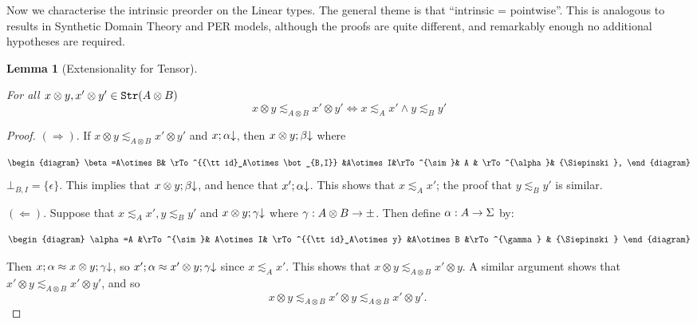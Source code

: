 \documentclass[11pt]{article}
\newtheorem{lemma}[theorem]{Lemma}
\newcommand{\Ip}[1]{\lesssim_{#1}}
\begin{document}
Now we characterise the intrinsic preorder on the Linear types. The
general theme is that ``intrinsic = pointwise''. This is analogous to
results in Synthetic Domain Theory and PER models, although the proofs
are quite different, and remarkably enough no additional hypotheses
are required.
\begin{lemma}[Extensionality for Tensor]\label{EfT}

For all $x\otimes y, x'\otimes y'\in{\tt Str}(A\otimes B)$
$$x\otimes y\Ip{A\otimes B} x'\otimes y' \Longleftrightarrow x\Ip A x'
\wedge y\Ip B y'$$
\end{lemma}
\begin{proof} $(\Rightarrow)$. If $x\otimes y\Ip{A\otimes B}
x'\otimes y'$ and $x;\alpha{\downarrow}$, then $x\otimes
y;\beta{\downarrow}$ where

\[\begin{diagram}
\beta=A\otimes B& \rTo^{{\tt id}_A\otimes\bot_{B,I}} &A\otimes
I&\rTo^{\sim}& A & \rTo^{\alpha}& {\Siepinski},
\end{diagram} \]
\noindent $\bot_{B,I}=\{\epsilon\}$. This implies that $x\otimes
y;\beta{\downarrow}$, and hence that $x';\alpha{\downarrow}$. This shows
that $x\Ip A x'$; the proof that $y\Ip B y'$ is similar.

$(\Leftarrow)$. Suppose that $x\Ip A x', y\Ip B y'$ and $x\otimes
y;\gamma{\downarrow}$ where $\gamma: A\otimes B\rightarrow{\cal
  {\Sigma}}$. Then define $\alpha:A\rightarrow {{\Sigma}}$ by:

\[\begin{diagram}
\alpha=A &\rTo^{\sim}& A\otimes I& \rTo^{{\tt id}_A\otimes y} &A\otimes
B &\rTo^{\gamma} & {\Siepinski}
\end{diagram} \]


Then $x;\alpha\approx x\otimes y;\gamma {\downarrow}$, so
$x';\alpha\approx x'\otimes y;\gamma{\downarrow}$ since $x\Ip A x'$.
This shows that $x\otimes y\Ip{A\otimes B} x'\otimes y$. A similar
argument shows that $x'\otimes y\Ip{A\otimes B} x'\otimes y'$, and
so $$x\otimes y\Ip{A\otimes B} x'\otimes y\Ip{A\otimes B}
x'\otimes y'.\;$$
\end{proof}
\end{document}
